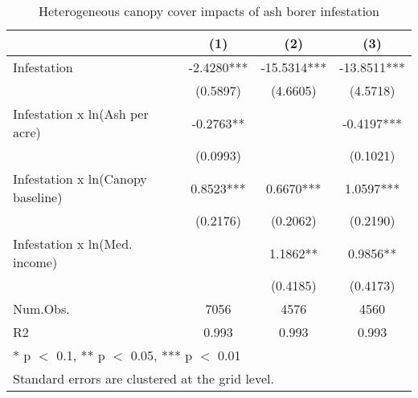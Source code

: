 \begin{table}[!h]

\caption{Heterogeneous canopy cover impacts of ash borer infestation}
\centering
\begin{tabular}[t]{lccc}
\toprule
  & (1) & (2) & (3)\\
\midrule
Infestation & -2.4280*** & -15.5314*** & -13.8511***\\
 & (0.5897) & (4.6605) & (4.5718)\\
Infestation x ln(Ash per acre) & -0.2763** &  & -0.4197***\\
 & (0.0993) &  & (0.1021)\\
Infestation x ln(Canopy baseline) & 0.8523*** & 0.6670*** & 1.0597***\\
 & (0.2176) & (0.2062) & (0.2190)\\
Infestation x ln(Med. income) &  & 1.1862** & 0.9856**\\
 &  & (0.4185) & (0.4173)\\
\midrule
Num.Obs. & 7056 & 4576 & 4560\\
R2 & 0.993 & 0.993 & 0.993\\
\bottomrule
\multicolumn{4}{l}{\rule{0pt}{1em}* p $<$ 0.1, ** p $<$ 0.05, *** p $<$ 0.01}\\
\multicolumn{4}{l}{\rule{0pt}{1em}Standard errors are clustered at the grid level.}\\
\end{tabular}
\end{table}
